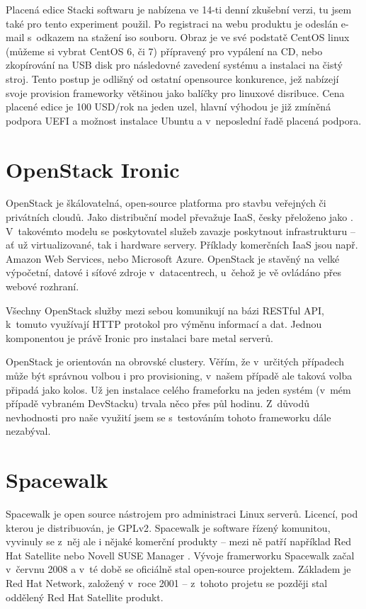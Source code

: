 Placená edice Stacki softwaru je nabízena ve 14-ti denní zkušební verzi, tu jsem také pro tento experiment použil. Po registraci na webu produktu je odeslán e-mail s~odkazem na stažení iso souboru. Obraz je ve své podstatě CentOS linux (můžeme si vybrat CentOS 6, či 7) přípravený pro vypálení na CD, nebo zkopírování na USB disk pro následovné zavedení systému a instalaci na čistý stroj. Tento postup je odlišný od ostatní opensource konkurence, jež nabízejí svoje provision frameworky většinou jako balíčky pro linuxové disribuce. Cena placené edice je 100 USD/rok na jeden uzel, hlavní výhodou je již zmíněná podpora UEFI a možnost instalace Ubuntu a v~neposlední řadě placená podpora.



\section{OpenStack Ironic}

OpenStack \cite{openstack} je škálovatelná, open-source platforma pro stavbu veřejných či privátních cloudů. Jako distribuční model převažuje IaaS, česky přeloženo jako . V~takovémto modelu se poskytovatel služeb zavazje poskytnout infrastrukturu -- ať už virtualizované, tak i hardware servery. Příklady komerčních IaaS jsou např. Amazon Web Services, nebo Microsoft Azure.  OpenStack je stavěný na velké výpočetní, datové i síťové zdroje v~datacentrech, u~čehož je vě ovládáno přes webové rozhraní.

Všechny OpenStack služby mezi sebou komunikují na bázi RESTful API, k~tomuto využívají HTTP protokol pro výměnu informací a dat. Jednou komponentou je právě Ironic pro instalaci bare metal serverů.

OpenStack je orientován na obrovské clustery. Věřím, že v~určitých případech může být správnou volbou i pro provisioning, v~našem případě ale taková volba připadá jako kolos. Už jen instalace celého frameforku na jeden systém (v~mém případě vybraném DevStacku) trvala něco přes půl hodinu. Z~důvodů nevhodnosti pro naše využití jsem se s~testováním tohoto frameworku dále nezabýval.


\section{Spacewalk}


Spacewalk \cite{spacewalk} je open source nástrojem pro administraci Linux serverů. Licencí, pod kterou je distribuován, je GPLv2\cite{gpl2}. Spacewalk je software řízený komunitou, vyvinuly se z~něj ale i nějaké komerční produkty -- mezi ně patří například Red Hat Satellite \cite{satellite} nebo Novell SUSE Manager \cite{suse-manager}. Vývoje framerworku Spacewalk začal v~červnu 2008 a v~té době se oficiálně stal open-source projektem. Základem je Red Hat Network, založený v~roce 2001 -- z~tohoto projetu se později stal oddělený Red Hat Satellite produkt.

